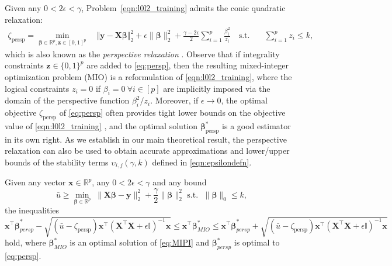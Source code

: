 \documentclass[opre,nonblindrev]{informs3} %
\begin{document}
Given any $0< 2 \epsilon< \gamma$, Problem~\eqref{eqn:l0l2_training} admits the conic quadratic relaxation:
\begin{align}\label{eq:persp}
	\zeta_{\text{persp}}=\min_{\bm{\beta} \in \mathbb{R}^p,\bm{z}\in [0,1]^p} \quad  \Vert \bm{y}-\bm{X}\bm{\beta}\Vert_2^2 +\epsilon\|\bm{\beta}\|_2^2 +\frac{\gamma-2\epsilon}{2} \sum_{i=1}^p \frac{\beta_i^2}{z_i} \quad \text{s.t.} \quad &\sum_{i=1}^pz_i \leq k,
\end{align}
which is also known as the \emph{perspective relaxation} \citep[c.f.][]{gunluk2010perspective}.
Observe that if integrality constraints $\bm{z}\in \{0,1\}^p$ are added to \eqref{eq:persp}, then the resulting mixed-integer optimization problem (MIO) is a reformulation of \eqref{eqn:l0l2_training}, where the logical constraints $z_i=0$ if $\beta_i= 0 \ \forall i \in [p]$ are implicitly imposed via the domain of the perspective function $\beta_i^2/z_i$. Moreover, if $\epsilon\to 0$, the optimal objective $\zeta_{\text{persp}}$ of \eqref{eq:persp} often provides tight lower bounds on the objective value of \eqref{eqn:l0l2_training} \citep[]{ bertsimas2020sparse}, and the optimal solution $\bm{\beta}_{\text{persp}}^*$ is a good estimator in its own right. As we establish in our main theoretical result, the perspective relaxation can also be used to obtain accurate approximations and lower/upper bounds of the stability terms $\upsilon_{i,j}(\gamma, k)$ defined in \eqref{eqn:epsilondefn}.

\begin{theorem}\label{prop:l10UB}
	Given any vector $\bm{x}\in \mathbb{R}^p$, any $0<2\epsilon< \gamma$ and any bound
	\begin{equation}\label{eq:MIPI}
			\bar u\geq \min_{\bm{\beta}\in \mathbb{R}^p}\; \|\bm{X}\bm{\beta}-\bm{y}\|_2^2+\frac{\gamma}{2}\|\bm{\beta}\|_2^2
			\text{ s.t. }\; \|\bm{\beta}\|_0\leq k,
	\end{equation} 
	the inequalities
	\small
	$$\bm{x^\top\beta}_{persp}^*-\sqrt{\left(\bar u-\zeta_{\text{persp}}\right)\bm{x^\top}\left(\bm{X^\top X}+\epsilon\mathbb{I}\right)^{-1}\bm{x}}\leq \bm{x}^\top \bm{\beta}_{MIO}^*\leq  \bm{x^\top\beta}_{persp}^*+\sqrt{\left(\bar u-\zeta_{\text{persp}}\right)\bm{x^\top}\left(\bm{X^\top X}+\epsilon\mathbb{I}\right)^{-1}\bm{x}}$$\normalsize
	hold, where $\bm{\beta}_{MIO}^*$ is an optimal solution of \eqref{eq:MIPI} and $\bm{\beta}_{persp}^*$ is optimal to \eqref{eq:persp}.
\end{theorem}
\end{document}
